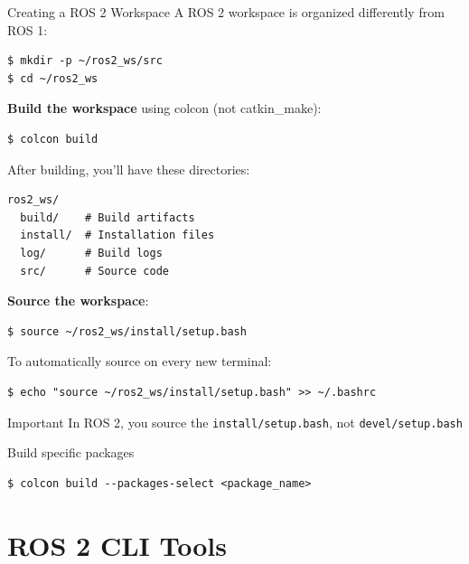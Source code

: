 \begin{frame}{Creating a ROS 2 Workspace}
    A ROS 2 workspace is organized differently from ROS 1:

    \begin{lstlisting}[language=shell]
$ mkdir -p ~/ros2_ws/src
$ cd ~/ros2_ws
\end{lstlisting}

    \textbf{Build the workspace} using colcon (not catkin\_make):
    \begin{lstlisting}[language=shell]
$ colcon build
\end{lstlisting}

    After building, you'll have these directories:
    \begin{lstlisting}[language=syntax]
ros2_ws/
  build/    # Build artifacts
  install/  # Installation files
  log/      # Build logs
  src/      # Source code
\end{lstlisting}

    \framebreak

    \textbf{Source the workspace}:
    \begin{lstlisting}[language=shell]
$ source ~/ros2_ws/install/setup.bash
\end{lstlisting}

    To automatically source on every new terminal:
    \begin{lstlisting}[language=shell]
$ echo "source ~/ros2_ws/install/setup.bash" >> ~/.bashrc
\end{lstlisting}

    \begin{alertblock}{Important}
        In ROS 2, you source the \texttt{install/setup.bash}, not \texttt{devel/setup.bash}
    \end{alertblock}

    \begin{alertblock}{Build specific packages}
        \begin{lstlisting}[language=shell]
$ colcon build --packages-select <package_name>
\end{lstlisting}
    \end{alertblock}
\end{frame}

\section{ROS 2 CLI Tools}

